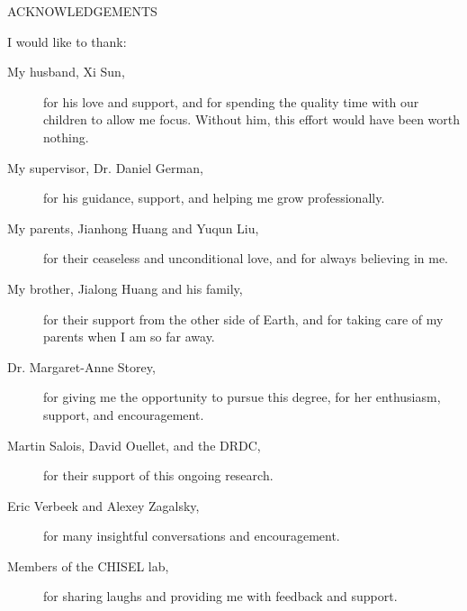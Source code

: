 \newpage
{}

\begin{center}
ACKNOWLEDGEMENTS
\end{center}

\noindent I would like to thank:
\begin{description}
\item[My husband, Xi Sun,]
	for his love and support, and for spending the quality time with our children to allow me focus. Without him, this effort would have been worth nothing.
\item[My supervisor, Dr. Daniel German,] 
	for his guidance, support, and helping me grow professionally. 
\item[My parents, Jianhong Huang and Yuqun Liu,] 
	for their ceaseless and unconditional love, and for always believing in me.
\item[My brother, Jialong Huang and his family,] 
	  for their support from the other side of Earth, and for taking care of my parents when I am so far away.
\item[Dr. Margaret-Anne Storey,] for giving me the opportunity to pursue this degree, for her enthusiasm, support, and encouragement.
\item[Martin Salois, David Ouellet, and the DRDC,]
for their support of this ongoing research.
\item[Eric Verbeek and Alexey Zagalsky,] for many insightful conversations and encouragement.
\item[Members of the CHISEL lab,] for sharing laughs and providing me with feedback
and support.
\end{description}

